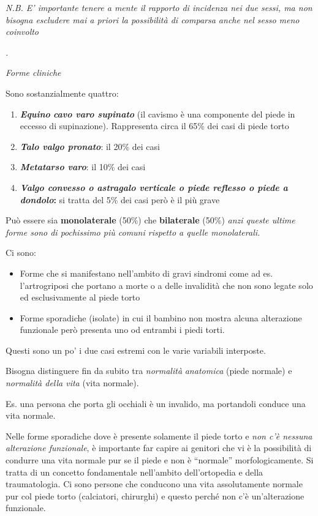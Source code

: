 \documentclass[]{article}
\begin{document}
\emph{N.B. E' importante tenere a mente il rapporto di incidenza nei due
sessi, ma non bisogna escludere mai a priori la possibilità di comparsa
anche nel sesso meno coinvolto}

\emph{.}

\emph{Forme cliniche}

Sono sostanzialmente quattro:

\begin{enumerate}
\def\labelenumi{\arabic{enumi}.}
\item
  \emph{\textbf{Equino} \textbf{cavo varo supinato}} (il cavismo è una
  componente del piede in eccesso di supinazione). Rappresenta circa il
  65\% dei casi di piede torto
\item
  \textbf{\emph{Talo valgo pronato}}: il 20\% dei casi
\item
  \textbf{\emph{Metatarso varo}}: il 10\% dei casi
\item
  \textbf{\emph{Valgo convesso o astragalo verticale o \emph{piede
  reflesso} o piede a dondolo}:} si tratta del 5\% dei casi però è il
  più grave
\end{enumerate}

Può essere sia \textbf{monolaterale} (50\%) che \textbf{bilaterale}
(50\%) \emph{anzi queste ultime forme sono di pochissimo più comuni
rispetto a quelle monolaterali.}

Ci sono:

\begin{itemize}
\item
  Forme che si manifestano nell'ambito di gravi sindromi come ad es.
  l'artrogriposi che portano a morte o a delle invalidità che non sono
  legate solo ed esclusivamente al piede torto
\item
  Forme sporadiche (isolate) in cui il bambino non mostra alcuna
  alterazione funzionale però presenta uno od entrambi i piedi torti.
\end{itemize}

Questi sono un po' i due casi estremi con le varie variabili interposte.

Bisogna distinguere fin da subito tra \emph{normalità} \emph{anatomica}
(piede normale) e \emph{normalità della vita} (vita normale).

Es. una persona che porta gli occhiali è un invalido, ma portandoli
conduce una vita normale.

Nelle forme sporadiche dove è presente solamente il piede torto e
\emph{non c'è nessuna alterazione funzionale}, è importante far capire
ai genitori che vi è la possibilità di condurre una vita normale pur se
il piede e non è ``normale'' morfologicamente. Si tratta di un concetto
fondamentale nell'ambito dell'ortopedia e della traumatologia. Ci sono
persone che conducono una vita assolutamente normale pur col piede torto
(calciatori, chirurghi) e questo perché non c'è un'alterazione
funzionale.
\end{document}
